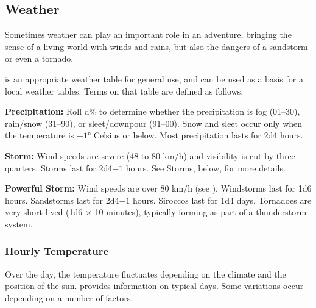 \subsection{Weather}
Sometimes weather can play an important role in an adventure, bringing the sense of a living world with winds and rains, but also the dangers of a sandstorm or even a tornado.

 is an appropriate weather table for general use, and can be used as a basis for a local weather tables. Terms on that table are defined as follows.


\textbf{Precipitation:} Roll d\% to determine whether the precipitation is fog (01--30), rain/snow (31--90), or sleet/downpour (91--00). Snow and sleet occur only when the temperature is $-1$° Celsius or below. Most precipitation lasts for 2d4 hours.

\textbf{Storm:} Wind speeds are severe (48 to 80 km/h) and visibility is cut by three-quarters. Storms last for 2d4$-1$ hours. See Storms, below, for more details.

\textbf{Powerful Storm:} Wind speeds are over 80 km/h (see ). Windstorms last for 1d6 hours. Sandstorms last for 2d4$-1$ hours. Siroccos last for 1d4 days. Tornadoes are very short-lived (1d6 $\times$ 10 minutes), typically forming as part of a thunderstorm system.

\subsubsection{Hourly Temperature}
Over the day, the temperature fluctuates depending on the climate and the position of the sun.  provides information on typical days. Some variations occur depending on a number of factors.

